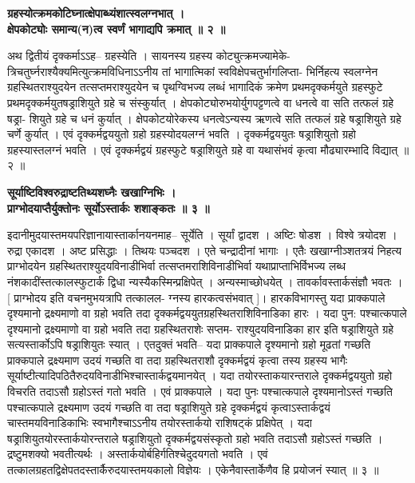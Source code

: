 \documentclass[11pt, openany]{book}
\begin{document}
{{{{\vspace{2mm}
\centering
\hspace{-1.9cm}
\textbf{
 ग्रहस्योत्क्रमकोटिघ्नात्क्षेपाब्ध्यंशात्स्वलग्नभात् ।\\
 क्षेपकोट्योः समान्य(न)त्व स्वर्णं भागाद्यपि क्रमात् ॥ २ ॥}

\vspace{2mm}
\justifying
 अथ द्वितीयं दृक्कर्माऽऽह-- ग्रहस्येति । सायनस्य ग्रहस्य
कोट्युत्क्रमज्यामेके-
त्रिचतुर्घ्नराश्यैक्यमित्युत्क्रमविधिनाऽऽनीय तां भागात्मिकां
स्वविक्षेपचतुर्भागलिप्ता-
भिर्निहत्य स्वलग्नेन ग्रहस्थितराश्युदयेन तत्सप्तमराश्युदयेन च
पृथग्विभज्य लब्धं
भागादिकं क्रमेण प्रथमदृक्कर्मयुते ग्रहस्फुटे
प्रथमदृक्कर्मयुतषड्राशियुते ग्रहे च
संस्कुर्यात् । क्षेपकोट्योरुभयोर्युगपट्टणत्वे वा धनत्वे वा सति तत्फलं
ग्रहे षड्रा-
शियुते ग्रहे च धनं कुर्यात् । क्षेपकोटयोरेकस्य धनत्वेऽन्यस्य ऋणत्वे
सति तत्फलं
ग्रहे षड्राशियुते ग्रहे चर्णे कुर्यात् । एवं दृक्कर्मद्वययुतो ग्रहो
ग्रहस्योदयलग्नं
भवति । दृक्कर्मद्वययुतः षड्राशियुतो ग्रहो ग्रहस्यास्तलग्नं भवति ।
एवं दृक्कर्मद्वयं
ग्रहस्फुटे षड्राशियुते ग्रहे वा यथासंभवं कृत्वा मौढ्यारम्भादि
विद्यात् ॥ २ ॥

\newpage
\thispagestyle{fancy}
\fancyhf{}
\rhead{[दृक्कर्माधिकारः]}
\centering
\hspace{-1.5cm}
\textbf{
 सूर्याष्टिविश्वरुद्राष्टतिथ्यशघ्नैः खखाग्निभिः ।\\
 प्राग्भोदयाप्तैर्युक्तोनः सूर्योऽस्तार्कः शशाङ्कतः ॥ ३ ॥}

\vspace{2mm}
\justifying
 इदानीमुदयास्तमयपरिज्ञानायास्तार्कानयनमाह-- सूर्येति । सूर्यां
द्वादश ।
अष्टिः षोडश । विश्वे त्रयोदश । रुद्रा एकादश । अष्ट प्रसिद्धाः ।
तिथयः
पञ्चदश । एते चन्द्रादीनां भागाः । एतैः खखाग्नीञ्शतत्रयं निहत्य
प्राग्भोदयेन
ग्रहस्थितराश्युदयविनाडीभिर्वा तत्सप्तमराशिविनाडीभिर्वा
यथाप्राप्ताभिर्विभज्य
लब्ध नंशकादींस्तत्कालस्फुटार्कं द्विधा न्यस्यैकस्मिन्प्रक्षिपेत्
। अन्यस्माच्छोधयेत् । 
तावर्कावस्तार्कसंज्ञौ भवतः । [ प्राग्भोदय इति
वचनमुभयत्रापि तत्कालल-
ग्नस्य हारकत्वसंभवात् ]। हारकविभागस्तु यदा प्राक्कपाले दृश्यमानो
द्रक्ष्यमाणो
वा ग्रहो भवति तदा दृक्कर्मद्वययुतग्रहस्थितराशिविनाडिका हारः । यदा
पुन:
पश्चात्कपाले दृश्यमानो द्रक्ष्यमाणो वा ग्रहो भवति तदा ग्रहस्थितराशेः
सप्तम-
राश्युदयविनाडिका हार इति षड्राशियुते ग्रहे सत्यस्तार्कोऽपि षड्राशियुतः
स्यात् । एतदुक्तं भवति-- यदा प्राक्कपाले दृश्यमानो ग्रहो मूढतां
गच्छति प्राक्कपाले
द्रक्ष्यमाण उदयं गच्छति वा तदा ग्रहस्थितराशौ दृक्कर्मद्वयं
कृत्वा
तस्य ग्रहस्य भागैः
सूर्याष्टीत्यादिपठितैरुदयविनाडीभिश्चास्तार्कद्वयमानयेत् । यदा
तयोरस्ताकयारन्तराले दृक्कर्मद्वययुतो ग्रहो विचरति तदाऽसौ ग्रहोऽस्तं
गतो
भवति । एवं प्राक्कपाले । यदा पुनः पश्चात्कपाले दृश्यमानोऽस्तं
गच्छति पश्चात्कपाले
द्रक्ष्यमाण उदयं गच्छति वा तदा षड्राशियुते ग्रहे
दृक्कर्मद्वयं कृत्वाऽस्तार्कद्वयं
चास्तमयविनाडिकाभिः स्वभागैश्चाऽऽनीय तयोरस्तार्कयो
राशिषट्कं
प्रक्षिपेत् । यदा षड्राशियुतयोरस्तार्कयोरन्तराले षड्राशियुतो
दृक्कर्मद्वयसंस्कृतो
ग्रहो भवति तदाऽसौ ग्रहोऽस्तं गच्छति । द्रष्टुमशक्यो
भवतीत्यर्थः ।
अस्तार्कयोर्बहिर्गतिश्चेदुदयगतो भवति । एवं
तत्कालग्रहतद्विक्षेपतदस्तार्कैरुदयास्तमयकालो
विज्ञेयः । एकेनैवास्तार्केणैव हि प्रयोजनं स्यात् ॥ ३ ॥

}}}}
\end{document}
